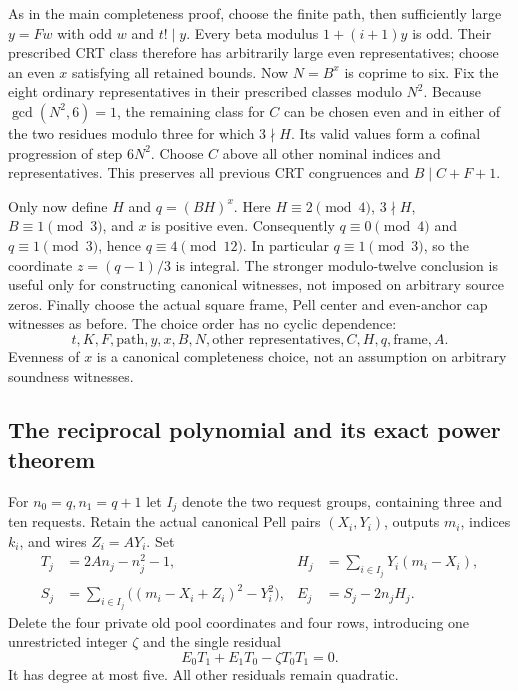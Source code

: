 As in the main completeness proof, choose the finite path, then sufficiently
large $y=Fw$ with odd $w$ and $t!\mid y$. Every beta modulus
$1+(i+1)y$ is odd. Their prescribed CRT class therefore has arbitrarily
large even representatives; choose an even $x$ satisfying all retained
bounds. Now $N=B^x$ is coprime to six. Fix the eight ordinary representatives
in their prescribed classes modulo $N^2$. Because $\gcd(N^2,6)=1$, the
remaining class for $C$ can be chosen even and in either of the two residues
modulo three for which $3\nmid H$. Its valid values form a cofinal progression
of step $6N^2$. Choose $C$ above all other nominal indices and representatives.
This preserves all previous CRT congruences and $B\mid C+F+1$.

Only now define $H$ and $q=(BH)^x$. Here $H\equiv2\pmod4$, $3\nmid H$,
$B\equiv1\pmod3$, and $x$ is positive even. Consequently
$q\equiv0\pmod4$ and $q\equiv1\pmod3$, hence $q\equiv4\pmod{12}$.
In particular $q\equiv1\pmod3$, so the coordinate $z=(q-1)/3$
is integral. The stronger modulo-twelve conclusion is useful only for
constructing canonical witnesses, not imposed on arbitrary source zeros. Finally choose the actual square
frame, Pell center and even-anchor cap witnesses as before. The choice
order has no cyclic dependence:
\[
 t,K,F,\text{path},y,x,B,N,\text{other representatives},C,H,q,\text{frame},A.
\]
Evenness of $x$ is a canonical completeness choice, not an assumption on
arbitrary soundness witnesses.

\subsection{The reciprocal polynomial and its exact power theorem}
For $n_0=q,n_1=q+1$ let $I_j$ denote the two request groups, containing
three and ten requests. Retain the actual canonical Pell pairs $(X_i,Y_i)$,
outputs $m_i$, indices $k_i$, and wires $Z_i=AY_i$. Set
\begin{align*}
 T_j&=2An_j-n_j^2-1,&H_j&=\sum_{i\in I_j}Y_i(m_i-X_i),\\
 S_j&=\sum_{i\in I_j}\bigl((m_i-X_i+Z_i)^2-Y_i^2\bigr),
 &E_j&=S_j-2n_jH_j.
\end{align*}
Delete the four private old pool coordinates and four rows, introducing
one unrestricted integer $\zeta$ and the single residual
\begin{equation}\label{eq:reciprocal}
 E_0T_1+E_1T_0-\zeta T_0T_1=0.
\end{equation}
It has degree at most five. All other residuals remain quadratic.

